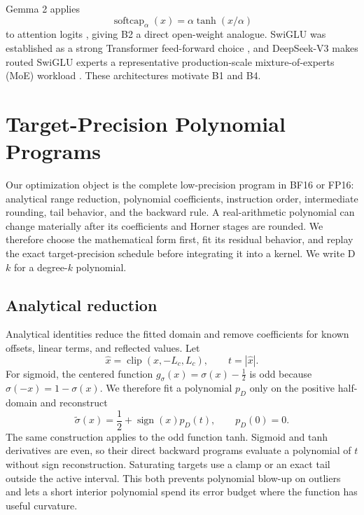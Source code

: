 \documentclass[11pt]{article}
\newcommand{\softcap}{\operatorname{softcap}}
\begin{document}
Gemma 2 applies
\begin{equation}
    \softcap_{\alpha}(x)=\alpha\tanh(x/\alpha)
    \label{eq:softcap}
\end{equation}
to attention logits \cite{gemmateam2024gemma2}, giving B2 a direct open-weight
analogue. SwiGLU was established as a strong Transformer feed-forward choice
\cite{shazeer2020glu}, and DeepSeek-V3 makes routed SwiGLU experts a
representative production-scale mixture-of-experts (MoE) workload
\cite{deepseekai2024deepseekv3}.
These architectures motivate B1 and B4.

\section{Target-Precision Polynomial Programs}

Our optimization object is the complete low-precision program in BF16 or FP16:
analytical range reduction, polynomial coefficients, instruction order,
intermediate rounding, tail behavior, and the backward rule. A real-arithmetic
polynomial can change materially after its coefficients and Horner stages are
rounded. We therefore choose the mathematical form first, fit its residual
behavior, and replay the exact target-precision schedule before integrating it
into a kernel. We write D$k$ for a degree-$k$ polynomial.

\subsection{Analytical reduction}

Analytical identities reduce the fitted domain and remove coefficients for
known offsets, linear terms, and reflected values. Let
\begin{equation}
    \hat{x}=\operatorname{clip}(x,-L_c,L_c), \qquad t=|\hat{x}|.
    \label{eq:reduction}
\end{equation}
For sigmoid, the centered function
$g_{\sigma}(x)=\sigma(x)-\tfrac{1}{2}$ is odd because
$\sigma(-x)=1-\sigma(x)$. We therefore fit a polynomial $p_D$ only on the
positive half-domain and reconstruct
\begin{equation}
    \widetilde{\sigma}(x)
    =\frac{1}{2}+\operatorname{sign}(x)p_D(t),
    \qquad p_D(0)=0.
    \label{eq:sigmoid}
\end{equation}
The same construction applies to the odd function tanh. Sigmoid and tanh
derivatives are even, so their direct backward programs evaluate a polynomial
of $t$ without sign reconstruction. Saturating targets use a clamp or an exact
tail outside the active interval. This both prevents polynomial blow-up on
outliers and lets a short interior polynomial spend its error budget where the
function has useful curvature.
\end{document}
